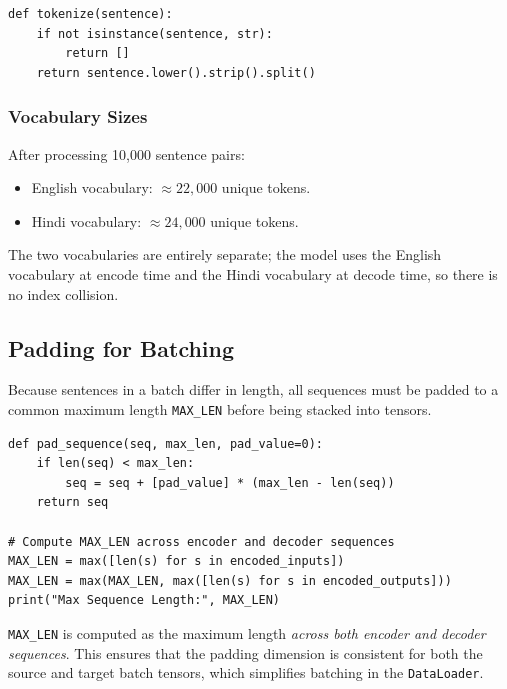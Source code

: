 \documentclass[12pt,a4paper]{article}
\begin{document}
\begin{codebox}[title=Tokenisation Function (Python)]
\begin{verbatim}
def tokenize(sentence):
    if not isinstance(sentence, str):
        return []
    return sentence.lower().strip().split()
\end{verbatim}
\end{codebox}

\subsubsection*{Vocabulary Sizes}

After processing 10{,}000 sentence pairs:
\begin{itemize}
  \item English vocabulary: $\approx 22{,}000$ unique tokens.
  \item Hindi vocabulary:   $\approx 24{,}000$ unique tokens.
\end{itemize}

The two vocabularies are entirely separate; the model uses the English
vocabulary at encode time and the Hindi vocabulary at decode time, so there is
no index collision.

\subsection{Padding for Batching}
\label{subsec:padding}

Because sentences in a batch differ in length, all sequences must be padded to
a common maximum length \texttt{MAX\_LEN} before being stacked into tensors.

\begin{codebox}[title=Padding Function (Python -- from slide V04)]
\begin{verbatim}
def pad_sequence(seq, max_len, pad_value=0):
    if len(seq) < max_len:
        seq = seq + [pad_value] * (max_len - len(seq))
    return seq

# Compute MAX_LEN across encoder and decoder sequences
MAX_LEN = max([len(s) for s in encoded_inputs])
MAX_LEN = max(MAX_LEN, max([len(s) for s in encoded_outputs]))
print("Max Sequence Length:", MAX_LEN)
\end{verbatim}
\end{codebox}

\begin{keyinsight}
  \texttt{MAX\_LEN} is computed as the maximum length \emph{across both encoder
  and decoder sequences}.  This ensures that the padding dimension is
  consistent for both the source and target batch tensors, which simplifies
  batching in the \texttt{DataLoader}.
\end{keyinsight}
\end{document}
